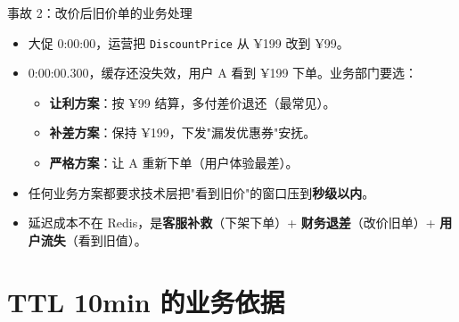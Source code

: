 \begin{frame}{事故 2：改价后旧价单的业务处理}
\begin{itemize}
  \item 大促 0:00:00，运营把 \texttt{DiscountPrice} 从 ¥199 改到 ¥99。
  \item 0:00:00.300，缓存还没失效，用户 A 看到 ¥199 下单。业务部门要选：
  \begin{itemize}
    \item \textbf{让利方案}：按 ¥99 结算，多付差价退还（最常见）。
    \item \textbf{补差方案}：保持 ¥199，下发"漏发优惠券"安抚。
    \item \textbf{严格方案}：让 A 重新下单（用户体验最差）。
  \end{itemize}
  \item 任何业务方案都要求技术层把"看到旧价"的窗口压到\textbf{秒级以内}。
  \item 延迟成本不在 Redis，是\textbf{客服补救}（下架下单）+ \textbf{财务退差}（改价旧单）+ \textbf{用户流失}（看到旧值）。
\end{itemize}
\end{frame}

\section{TTL 10min 的业务依据}

